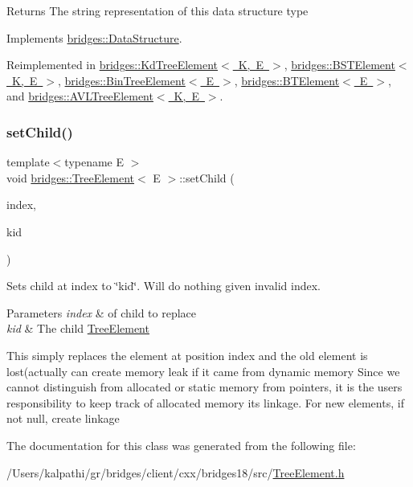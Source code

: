 \begin{DoxyReturn}{Returns}
The string representation of this data structure type 
\end{DoxyReturn}


Implements \mbox{\hyperlink{classbridges_1_1_data_structure_a957a63b106e340bc753620c650632bdc}{bridges\+::\+Data\+Structure}}.



Reimplemented in \mbox{\hyperlink{classbridges_1_1_kd_tree_element_acdd8f989986b7dd42cfacec73cf52dcb}{bridges\+::\+Kd\+Tree\+Element$<$ K, E $>$}}, \mbox{\hyperlink{classbridges_1_1_b_s_t_element_af3843873c508c24f90b6e73a6f490bf8}{bridges\+::\+B\+S\+T\+Element$<$ K, E $>$}}, \mbox{\hyperlink{classbridges_1_1_bin_tree_element_a0a154f68ef0a58715e598a6ef92b9e59}{bridges\+::\+Bin\+Tree\+Element$<$ E $>$}}, \mbox{\hyperlink{classbridges_1_1_b_t_element_a43cc18d2c1e71c399782a306b60e4260}{bridges\+::\+B\+T\+Element$<$ E $>$}}, and \mbox{\hyperlink{classbridges_1_1_a_v_l_tree_element_a24c005f8e07a7a2682225cead3b7e364}{bridges\+::\+A\+V\+L\+Tree\+Element$<$ K, E $>$}}.

\mbox{\label{classbridges_1_1_tree_element_aa12cb7cb4b4f559bdf0967872b0a6e7d}} 
\subsubsection{\texorpdfstring{set\+Child()}{setChild()}}
{\footnotesize\ttfamily template$<$typename E $>$ \\
void \mbox{\hyperlink{classbridges_1_1_tree_element}{bridges\+::\+Tree\+Element}}$<$ E $>$\+::set\+Child (\begin{DoxyParamCaption}\item[{const size\+\_\+t \&}]{index,  }\item[{\mbox{\hyperlink{classbridges_1_1_tree_element}{Tree\+Element}}$<$ E $>$ $\ast$}]{kid }\end{DoxyParamCaption})\hspace{0.3cm}{\ttfamily [inline]}}

Sets child at index to \char`\"{}kid\char`\"{}. Will do nothing given invalid index.


\begin{DoxyParams}{Parameters}
{\em index} & of child to replace \\
\hline
{\em kid} & The child \mbox{\hyperlink{classbridges_1_1_tree_element}{Tree\+Element}} \\
\hline
\end{DoxyParams}
This simply replaces the element at position index and the old element is lost(actually can create memory leak if it came from dynamic memory Since we cannot distinguish from allocated or static memory from pointers, it is the user\textquotesingle{}s responsibility to keep track of allocated memory its linkage. For new elements, if not null, create linkage

The documentation for this class was generated from the following file\+:\begin{DoxyCompactItemize}
\item 
/\+Users/kalpathi/gr/bridges/client/cxx/bridges18/src/\mbox{\hyperlink{_tree_element_8h}{Tree\+Element.\+h}}\end{DoxyCompactItemize}
